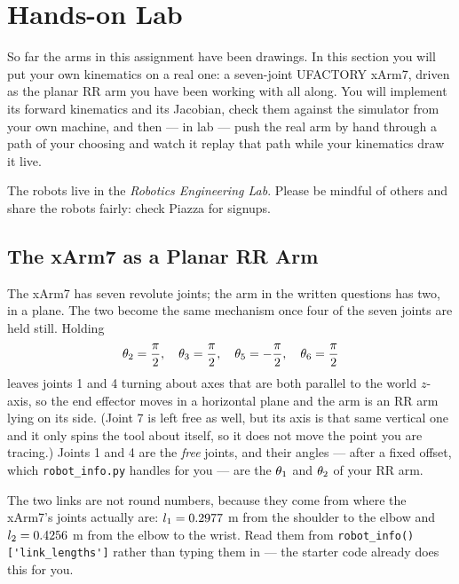 \documentclass{16384_doc}
\begin{document}
\section{Hands-on Lab}


So far the arms in this assignment have been drawings.  In this section you will
put your own kinematics on a real one: a seven-joint UFACTORY xArm7, driven as
the planar RR arm you have been working with all along.  You will implement its
forward kinematics and its Jacobian, check them against the simulator from your
own machine, and then --- in lab --- push the real arm by hand through a path of
your choosing and watch it replay that path while your kinematics draw it live.

The robots live in the \emph{Robotics Engineering Lab}.  Please be mindful of
others and share the robots fairly: check Piazza for signups.

\subsection{The xArm7 as a Planar RR Arm}

The xArm7 has seven revolute joints; the arm in the written questions has two,
in a plane.  The two become the same mechanism once four of the seven joints are
held still.  Holding
\[
    \th[2] = \piover{2}, \quad
    \th[3] = \piover{2}, \quad
    \th[5] = -\piover{2}, \quad
    \th[6] = \piover{2}
\]
leaves joints 1 and 4 turning about axes that are both parallel to the world
$z$-axis, so the end effector moves in a horizontal plane and the arm is an RR
arm lying on its side.  (Joint 7 is left free as well, but its axis is that same
vertical one and it only spins the tool about itself, so it does not move the
point you are tracing.)  Joints 1 and 4 are the \emph{free} joints, and their
angles --- after a fixed offset, which \verb!robot_info.py! handles for you ---
are the $\th[1]$ and $\th[2]$ of your RR arm.

The two links are not round numbers, because they come from where the xArm7's
joints actually are: $\l[1] = 0.2977$ m from the shoulder to the elbow and
$\l[2] = 0.4256$ m from the elbow to the wrist.  Read them from
\verb!robot_info()['link_lengths']! rather than typing them in --- the starter
code already does this for you.
\end{document}
